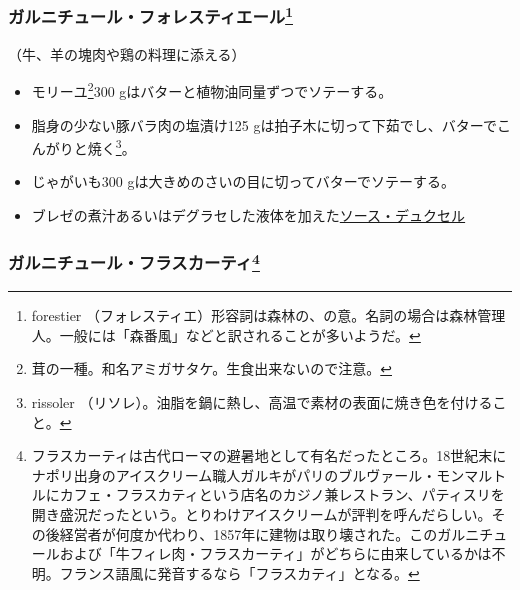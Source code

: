 \begin{recette}
\hypertarget{garniture-a-la-Forestiere}{%
\subsubsection[ガルニチュール・フォレスティエール]{\texorpdfstring{ガルニチュール・フォレスティエール\footnote{forestier
  （フォレスティエ）形容詞は森林の、の意。名詞の場合は森林管理人。一般には「森番風」などと訳されることが多いようだ。}}{ガルニチュール・フォレスティエール}}\label{garniture-a-la-Forestiere}}



（牛、羊の塊肉や鶏の料理に添える）

\begin{itemize}
\item
  モリーユ\footnote{茸の一種。和名アミガサタケ。生食出来ないので注意。}300
  gはバターと植物油同量ずつでソテーする。
\item
  脂身の少ない豚バラ肉の塩漬け125
  gは拍子木に切って下茹でし、バターでこんがりと焼く\footnote{rissoler
    （リソレ）。油脂を鍋に熱し、高温で素材の表面に焼き色を付けること。}。
\item
  じゃがいも300 gは大きめのさいの目に切ってバターでソテーする。
\item
  ブレゼの煮汁あるいはデグラセした液体を加えた\protect\hyperlink{sauce-duxelles}{ソース・デュクセル}
\end{itemize}

\hypertarget{garniture-frascati}{%
\subsubsection[ガルニチュール・フラスカーティ]{\texorpdfstring{ガルニチュール・フラスカーティ\footnote{フラスカーティは古代ローマの避暑地として有名だったところ。18世紀末にナポリ出身のアイスクリーム職人ガルキがパリのブルヴァール・モンマルトルにカフェ・フラスカティという店名のカジノ兼レストラン、パティスリを開き盛況だったという。とりわけアイスクリームが評判を呼んだらしい。その後経営者が何度か代わり、1857年に建物は取り壊された。このガルニチュールおよび「牛フィレ肉・フラスカーティ」がどちらに由来しているかは不明。フランス語風に発音するなら「フラスカティ」となる。}}{ガルニチュール・フラスカーティ}}\label{garniture-frascati}}


\end{recette}
